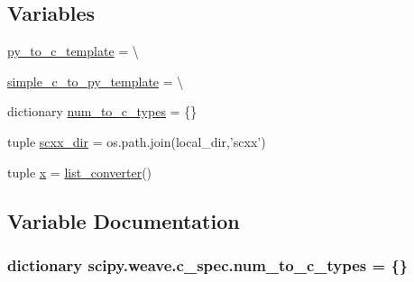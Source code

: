 \subsection*{Variables}
\begin{DoxyCompactItemize}
\item 
\hyperlink{namespacescipy_1_1weave_1_1c__spec_ad510ac3aa3d5ab423532ed5f4003e97a}{py\+\_\+to\+\_\+c\+\_\+template} = \textbackslash{}
\item 
\hyperlink{namespacescipy_1_1weave_1_1c__spec_addc46877ce83db84236b0399712d5d9e}{simple\+\_\+c\+\_\+to\+\_\+py\+\_\+template} = \textbackslash{}
\item 
dictionary \hyperlink{namespacescipy_1_1weave_1_1c__spec_a1732188753394989aeca73a0d1bc01da}{num\+\_\+to\+\_\+c\+\_\+types} = \{\}
\item 
tuple \hyperlink{namespacescipy_1_1weave_1_1c__spec_aa949098eca50c7217dc9f43fe14c5a37}{scxx\+\_\+dir} = os.\+path.\+join(local\+\_\+dir,'scxx')
\item 
tuple \hyperlink{namespacescipy_1_1weave_1_1c__spec_a11da7db863b01f5a039757784edcb308}{x} = \hyperlink{classscipy_1_1weave_1_1c__spec_1_1list__converter}{list\+\_\+converter}()
\end{DoxyCompactItemize}


\subsection{Variable Documentation}
\hypertarget{namespacescipy_1_1weave_1_1c__spec_a1732188753394989aeca73a0d1bc01da}{}
\subsubsection[{num\+\_\+to\+\_\+c\+\_\+types}]{\setlength{\rightskip}{0pt plus 5cm}dictionary scipy.\+weave.\+c\+\_\+spec.\+num\+\_\+to\+\_\+c\+\_\+types = \{\}}\label{namespacescipy_1_1weave_1_1c__spec_a1732188753394989aeca73a0d1bc01da}
\hypertarget{namespacescipy_1_1weave_1_1c__spec_ad510ac3aa3d5ab423532ed5f4003e97a}{}
